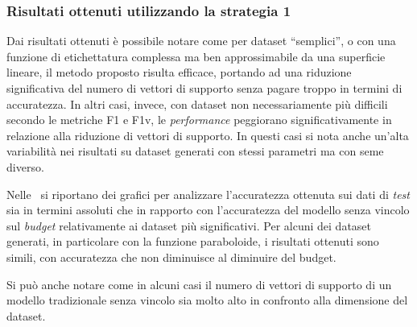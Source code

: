 \subsubsection{Risultati ottenuti utilizzando la strategia 1}
Dai risultati ottenuti è possibile notare come per dataset ``semplici'', o con una funzione di etichettatura complessa ma ben approssimabile da una superficie lineare, il metodo proposto risulta efficace, portando ad una riduzione significativa del numero di vettori di supporto senza pagare troppo in termini di accuratezza.
In altri casi, invece, con dataset non necessariamente più difficili secondo le metriche F1 e F1v, le \emph{performance} peggiorano significativamente in relazione alla riduzione di vettori di supporto. In questi casi si nota anche un'alta variabilità nei risultati su dataset generati con stessi parametri ma con seme diverso.

Nelle~ si riportano dei grafici per analizzare l'accuratezza ottenuta sui dati di \emph{test} sia in termini assoluti che in rapporto con l'accuratezza del modello senza vincolo sul \emph{budget} relativamente ai dataset più significativi.
Per alcuni dei dataset generati, in particolare con la funzione paraboloide, i risultati ottenuti sono simili, con accuratezza che non diminuisce al diminuire del budget.


Si può anche notare come in alcuni casi il numero di vettori di supporto di un modello tradizionale senza vincolo sia molto alto in confronto alla dimensione del dataset.

